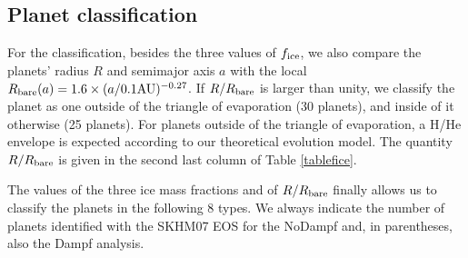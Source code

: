 \documentclass[]{emulateapj}
\begin{document}
\subsection{Planet classification}
For the classification, besides the three values of $f_{\rm ice}$, we also compare the planets' radius $R$ and semimajor axis $a$ with the local $R_{\rm bare}(a)=1.6 \times (a/0.1 \mathrm{AU})^{-0.27}$. If $R/R_{\rm bare}$ is larger than unity, we classify the planet as one outside of the triangle of evaporation (30 planets), and inside of it otherwise (25 planets). For planets outside of the triangle of evaporation, a H/He envelope is expected according to our theoretical evolution model. The quantity $R/R_{\rm bare}$ is given in the second last column of Table \ref{tablefice}.

The values of the three ice mass fractions and of $R/R_{\rm bare}$ finally allows us to classify the planets in the following 8 types. We always indicate the number of planets identified with the SKHM07 EOS for the NoDampf and, in parentheses, also the Dampf analysis. 
\end{document}
